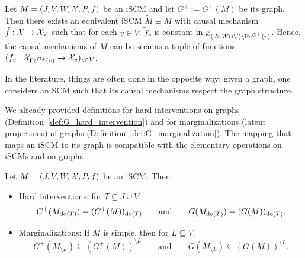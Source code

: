 \begin{Rem}\label{rem:iscm_structurally_minimal}
  Let $M = \left ( J, V, W, \mathcal{X}, P, f \right )$ be an iSCM and let $G^+ := G^+(M)$ be its graph.
  Then there exists an equivalent iSCM $\tilde{M} \equiv M$ with causal mechanism $\tilde{f} : \mathcal{X} \to \mathcal{X}_V$ such that for each $v \in V$:
  $\tilde f_v$ is constant in $x_{(J \cup W \cup V) \setminus \mathrm{Pa}^{G^+}(v)}$.
  Hence, the causal mechanisms of $\tilde{M}$ can be seen as a tuple of functions $(\tilde f_v : \mathcal{X}_{\mathrm{Pa}^{G+}(v)} \to \mathcal{X}_v)_{v \in V}$.
\end{Rem}
In the literature, things are often done in the opposite way: given a graph, one considers an SCM such that its causal mechanisms respect the graph structure.

We already provided definitions for hard interventions on graphs (Definition~\ref{def:G_hard_intervention})
and for marginalizations (latent projections) of graphs (Definition~\ref{def:G_marginalization}). 
The mapping that maps an iSCM to its graph is compatible with the elementary operations on iSCMs and on graphs.
\begin{Prp}\label{prp:compatibility_graph}
  Let $M = \left ( J, V, W, \mathcal{X}, P, f \right )$ be an iSCM. Then
  \begin{itemize}
    \item Hard interventions: for $T \subseteq J \cup V$, 
      $$G^+(M_{\operatorname{do}(T)}) = (G^+(M))_{\operatorname{do}(T)} \qquad \text{and} \qquad G(M_{\operatorname{do}(T)}) = (G(M))_{\operatorname{do}(T)}.$$
    \item Marginalizations: If $M$ is simple, then for $L \subseteq V$, 
      $$G^+(M_{\setminus L}) \subseteq (G^+(M))^{\setminus L} \qquad \text{and} \qquad G(M_{\setminus L}) \subseteq (G(M))^{\setminus L}.$$
  \end{itemize}
\end{Prp}
